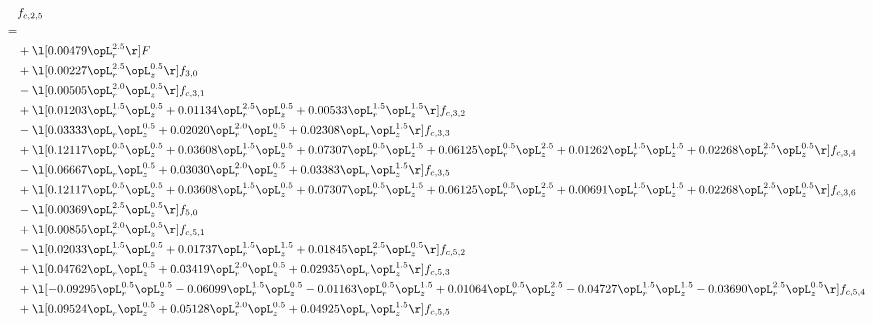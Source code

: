 \begin{alignat}{2} 
\label{eq:f_25_2} 
& f_{c,2,5} \nonumber \\ 
 = \\ 
& + \l[  0.00479 \opL_r^{2.5}  \r] F \nonumber \\ 
& + \l[  0.00227 \opL_r^{2.5} \opL_z^{0.5}  \r] f_{3,0} \nonumber \\ 
& - \l[  0.00505 \opL_r^{2.0} \opL_z^{0.5}  \r] f_{c,3,1} \nonumber \\ 
& + \l[  0.01203 \opL_r^{1.5} \opL_z^{0.5} +  0.01134 \opL_r^{2.5} \opL_z^{0.5} +  0.00533 \opL_r^{1.5} \opL_z^{1.5}  \r] f_{c,3,2} \nonumber \\ 
& - \l[  0.03333 \opL_r \opL_z^{0.5} +  0.02020 \opL_r^{2.0} \opL_z^{0.5} +  0.02308 \opL_r \opL_z^{1.5}  \r] f_{c,3,3} \nonumber \\ 
& + \l[  0.12117 \opL_r^{0.5} \opL_z^{0.5} +  0.03608 \opL_r^{1.5} \opL_z^{0.5} +  0.07307 \opL_r^{0.5} \opL_z^{1.5} +  0.06125 \opL_r^{0.5} \opL_z^{2.5} +  0.01262 \opL_r^{1.5} \opL_z^{1.5} +  0.02268 \opL_r^{2.5} \opL_z^{0.5}  \r] f_{c,3,4} \nonumber \\ 
& - \l[  0.06667 \opL_r \opL_z^{0.5} +  0.03030 \opL_r^{2.0} \opL_z^{0.5} +  0.03383 \opL_r \opL_z^{1.5}  \r] f_{c,3,5} \nonumber \\ 
& + \l[  0.12117 \opL_r^{0.5} \opL_z^{0.5} +  0.03608 \opL_r^{1.5} \opL_z^{0.5} +  0.07307 \opL_r^{0.5} \opL_z^{1.5} +  0.06125 \opL_r^{0.5} \opL_z^{2.5} +  0.00691 \opL_r^{1.5} \opL_z^{1.5} +  0.02268 \opL_r^{2.5} \opL_z^{0.5}  \r] f_{c,3,6} \nonumber \\ 
& - \l[  0.00369 \opL_r^{2.5} \opL_z^{0.5}  \r] f_{5,0} \nonumber \\ 
& + \l[  0.00855 \opL_r^{2.0} \opL_z^{0.5}  \r] f_{c,5,1} \nonumber \\ 
& - \l[  0.02033 \opL_r^{1.5} \opL_z^{0.5} +  0.01737 \opL_r^{1.5} \opL_z^{1.5} +  0.01845 \opL_r^{2.5} \opL_z^{0.5}  \r] f_{c,5,2} \nonumber \\ 
& + \l[  0.04762 \opL_r \opL_z^{0.5} +  0.03419 \opL_r^{2.0} \opL_z^{0.5} +  0.02935 \opL_r \opL_z^{1.5}  \r] f_{c,5,3} \nonumber \\ 
& + \l[  -0.09295 \opL_r^{0.5} \opL_z^{0.5}   -0.06099 \opL_r^{1.5} \opL_z^{0.5}   -0.01163 \opL_r^{0.5} \opL_z^{1.5} +  0.01064 \opL_r^{0.5} \opL_z^{2.5}   -0.04727 \opL_r^{1.5} \opL_z^{1.5}   -0.03690 \opL_r^{2.5} \opL_z^{0.5}  \r] f_{c,5,4} \nonumber \\ 
& + \l[  0.09524 \opL_r \opL_z^{0.5} +  0.05128 \opL_r^{2.0} \opL_z^{0.5} +  0.04925 \opL_r \opL_z^{1.5}  \r] f_{c,5,5} \nonumber \\ 

\end{alignat}
